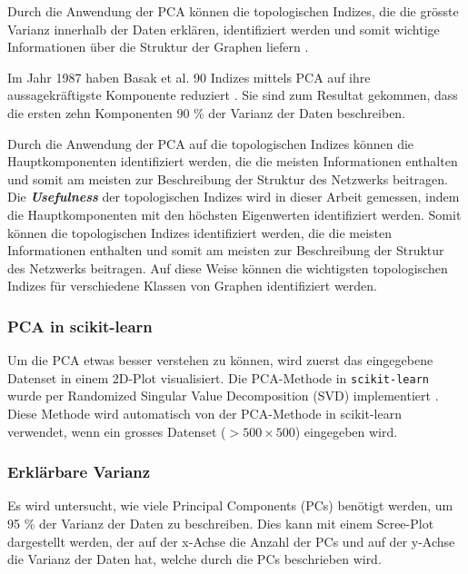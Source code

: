 Durch die Anwendung der PCA können die topologischen Indizes, die die grösste Varianz innerhalb der Daten erklären, identifiziert werden und somit wichtige Informationen über die Struktur der Graphen liefern \cite[p.~303]{basak_topological_1987}.

Im Jahr 1987 haben Basak et al. 90 Indizes mittels PCA auf ihre aussagekräftigste Komponente reduziert \cite{basak_topological_1987}.
Sie sind zum Resultat gekommen, dass die ersten zehn Komponenten 90 \% der Varianz der Daten beschreiben.

Durch die Anwendung der PCA auf die topologischen Indizes können die Hauptkomponenten identifiziert werden, die die meisten Informationen enthalten und somit am meisten zur Beschreibung der Struktur des Netzwerks beitragen.
Die \textbf{\textit{Usefulness}} der topologischen Indizes wird in dieser Arbeit gemessen, indem die Hauptkomponenten mit den höchsten Eigenwerten identifiziert werden.
Somit können die topologischen Indizes identifiziert werden, die die meisten Informationen enthalten und somit am meisten zur Beschreibung der Struktur des Netzwerks beitragen.
Auf diese Weise können die wichtigsten topologischen Indizes für verschiedene Klassen von Graphen identifiziert werden.

\subsubsection{PCA in scikit-learn}

Um die PCA etwas besser verstehen zu können, wird zuerst das eingegebene Datenset in einem 2D-Plot visualisiert.
Die PCA-Methode in \texttt{scikit-learn} wurde per Randomized Singular Value Decomposition (SVD) implementiert \cite{halko_finding_2011}.
Diese Methode wird automatisch von der PCA-Methode in scikit-learn verwendet, wenn ein grosses Datenset ($> 500 \times 500$) eingegeben wird.

\subsubsection{Erklärbare Varianz}

Es wird untersucht, wie viele Principal Components (PCs) benötigt werden, um 95 \% der Varianz der Daten zu beschreiben.
Dies kann mit einem Scree-Plot dargestellt werden, der auf der x-Achse die Anzahl der PCs und auf der y-Achse die Varianz der Daten hat, welche durch die PCs beschrieben wird.

